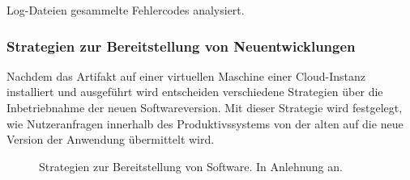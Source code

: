 Log-Dateien gesammelte Fehlercodes analysiert. 

\subsubsection{Strategien zur Bereitstellung von Neuentwicklungen}
\label{sec:Bereitstellungs_Strategien}
Nachdem das Artifakt auf einer virtuellen Maschine einer Cloud-Instanz installiert und ausgeführt wird entscheiden verschiedene Strategien über die Inbetriebnahme der neuen Softwareversion. Mit dieser Strategie wird festgelegt, wie Nutzeranfragen innerhalb des Produktivssystems von der alten auf die neue Version der Anwendung übermittelt wird.
\begin{center}
	\begin{figure}[H]
		\centering
		\caption[Strategien zur Bereitstellung von Software]{Strategien zur Bereitstellung von Software. In Anlehnung an.}
		\label{fig:DS}
	\end{figure}
\end{center}
\vspace*{-10mm}
